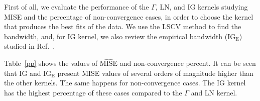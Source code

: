 \documentclass[twocolumn]{svjour3}
\begin{document}
%    
First of all, we evaluate the performance of the $\Gamma$, LN, and IG kernels studying MISE and the percentage of non-convergence cases, in order to choose the kernel that produces the best fits of the data. 
We use the LSCV method to find the bandwidth, and, for IG kernel, we also review the empirical bandwidth ($\text{IG}_{\text{E}}$) studied in Ref.~\cite{gambini2015}. 

Table~\ref{pp} shows the values of $\widehat{\text{MISE}}$ and non-convergence percent. 
It can be seen that IG and $\text{IG}_{\text{E}}$ present MISE values of several orders of magnitude higher than the other kernels. 
The same happens for non-convergence cases. 
The IG kernel has the highest percentage of these cases compared to the $\Gamma$ and LN kernel.
\end{document}
